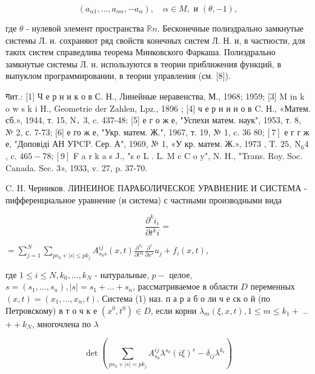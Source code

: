 \documentclass[10pt]{article}
\begin{document}
\[

\left(a_{\alpha 1}, \ldots, a_{\alpha n},-a_{\alpha}\right), \quad \alpha \in M, \text { и }(\theta,-1),

\]



где $\theta$ - нулевой элемент пространства $\mathbb{R} n$. Бесконечные полиэдрально замкнутые системы Л. н. сохраняют ряд свойств конечных систем Л. Н. и, в частности, для такпх систем справедлива теорема Минковского Фаркаша. Полиэдрально замкнутые системы Л. н. используются в теории приближения функций, в выпуклом программировании, в теории управления (см. [8]).



गит.: [1] Ч е р н и к о в С. Н., Линейные неравенства, М., 1968; 1959; [3] M in k o w s k i H., Geometrie der Zahlen, Lpz., 1896 ; [4] ч е р н и н о в C. Н., «Матем. сб.», 1944, т. 15, N․ 3, c. 437-48: [5] е г о ж е, "Успехи матем. наук", 1953, т. 8, № 2, с. 7-73; [6] е го ж е, "Укр. матем. Ж.", 1967, т. 19, № 1, c. 36 $80 ;[7]$ е г г ж е, "Доповіді АН УPCP. Сер. А", 1969, № 1, «У кр. матем. Ж.», 1973 , T. $25, \mathrm{~N}_{6} 4$, c. $465-78 ;[9]$ F a r k a s J., "s e L . L. M c C o y", N. H., "Trans. Roy. Soc. Canada. Sec. 3», 1933, v. 27, p. 37-70.



C. H. Черников. ЛИНЕИНОЕ ПАРАБОЛИЧЕСКОЕ УРАВНЕНИЕ И СИСТЕМА - пифференциальное уравнение (и система) с частными производными вида



\[

\frac{\partial^{k} i_{i}}{\partial t^{k} i}=

\]



$=\sum_{j=1}^{N} \sum_{p s_{0}+|s| \leqslant p k_{j}} A_{s_{0} s}^{i j}(x, t) \frac{\partial^{s_{0}}}{\partial t^{s_{0}}} \frac{\partial^{s}}{\partial x^{s}} u_{j}+f_{i}(x, t)$,



где $1 \leqslant i \leqslant N, k_{0}, \ldots, k_{N}$ - натуральные, $p-$ целое, $s=\left(s_{1}, \ldots, s_{n}\right),|s|=s_{1}+\ldots+s_{n}$, рассматриваемое в области $D$ переменных $(x, t)=\left(x_{1}, \ldots, x_{n}, t\right)$. Система (1) наз. п а р а б о ли ч е ск о й (по Петровскому) в т о ч к е $\left(x^{0}, t^{0}\right) \in D$, если корни $\lambda_{m}(\xi, x, t), 1 \leqslant m \leqslant k_{1}+$ ..$++k_{N}$, многочлена по $\lambda$



\[

\operatorname{det}\left(\sum_{p s_{0}+|s|=p k_{j}} A_{s_{0}}^{i j} \lambda^{s_{0}}(i \xi)^{s}-\delta_{i j} \lambda^{k_{i}}\right)

\]
\end{document}
